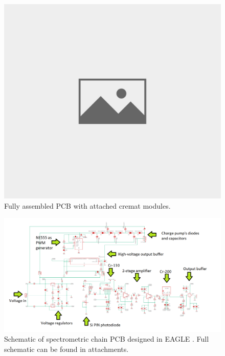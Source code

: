 \begin{figure}[H]
 \centering
 \includegraphics[scale=0.35, angle = 0]{./pictures/NoPicture.jpg}
 \caption{Fully assembled PCB with attached cremat modules.}
 \label{PCBphyss}
 
\end{figure}



\newpage

\begin{figure}[H]
 \centering
 \includegraphics[scale=0.5, angle = 90]{./pictures/schemaPopis.png}
 \caption{Schematic of spectrometric chain PCB designed in EAGLE \cite{eagle}. Full schematic can be found in attachments.}
 \label{schematic}
 
\end{figure}

